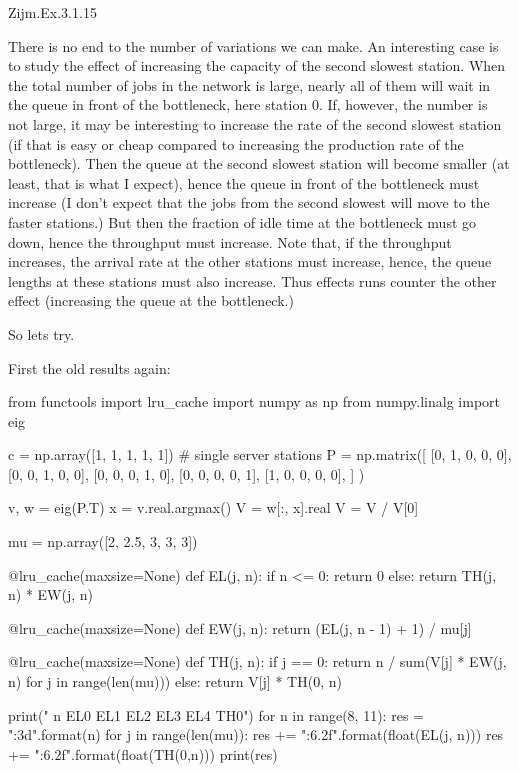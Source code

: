 \begin{exercise}
Zijm.Ex.3.1.15
\begin{solution}
  There is no end to the number of variations we can make. An
  interesting case is to study the effect of increasing the capacity
  of the second slowest station. When the total number of jobs in the
  network is large, nearly all of them will wait in the queue in front
  of the bottleneck, here station 0. If, however, the number is not
  large, it may be interesting to increase the rate of the second
  slowest station (if that is easy or cheap compared to increasing the
  production rate of the bottleneck). Then the queue at the second
  slowest station will become smaller (at least, that is what I
  expect), hence the queue in front of the bottleneck must increase (I
  don't expect that the jobs from the second slowest will move to the
  faster stations.)  But then the fraction of idle time at the
  bottleneck must go down, hence the throughput must increase. Note
  that, if the throughput increases, the arrival rate at the other
  stations must increase, hence, the queue lengths at these stations
  must also increase. Thus effects runs counter the other effect
  (increasing the queue at the bottleneck.)

  So lets try.

First the old results again:

\begin{pyconsole}
from functools import lru_cache
import numpy as np
from numpy.linalg import eig


c = np.array([1, 1, 1, 1, 1])  # single server stations
P = np.matrix([
    [0, 1, 0, 0, 0],
    [0, 0, 1, 0, 0],
    [0, 0, 0, 1, 0],
    [0, 0, 0, 0, 1],
    [1, 0, 0, 0, 0],
]
)

v, w = eig(P.T)
x = v.real.argmax()
V = w[:, x].real
V = V / V[0]

mu = np.array([2, 2.5, 3, 3, 3])

@lru_cache(maxsize=None)
def EL(j, n):
    if n <= 0:
        return 0
    else:
        return TH(j, n) * EW(j, n)

@lru_cache(maxsize=None)
def EW(j, n):
    return (EL(j, n - 1) + 1) / mu[j]


@lru_cache(maxsize=None)
def TH(j, n):
    if j == 0:
        return n / sum(V[j] * EW(j, n) for j in range(len(mu)))
    else:
        return V[j] * TH(0, n)

print(" n  EL0  EL1  EL2   EL3   EL4 TH0")
for n in range(8, 11):
    res = "{:3d}".format(n)
    for j in range(len(mu)):
        res += "{:6.2f}".format(float(EL(j, n)))
    res += "{:6.2f}".format(float(TH(0,n)))
    print(res)
  

\end{pyconsole}
\end{solution}
\end{exercise}
